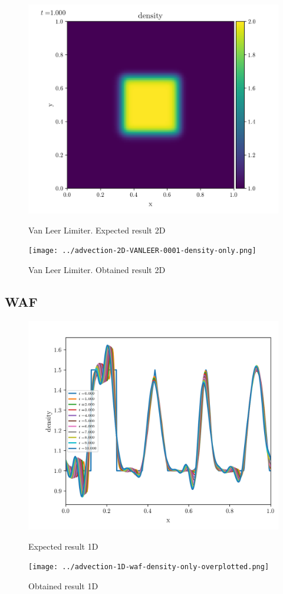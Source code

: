     \begin{figure}[htbp]
        \centering
        \includegraphics[width=.7\textwidth]{./figures/advection-2D-VANLEER-0001-density-only.png}%
        \caption{Van Leer Limiter. Expected result 2D}
        \texttt{[image: ../advection-2D-VANLEER-0001-density-only.png]}%
        \caption{Van Leer Limiter. Obtained result 2D}
    \end{figure}







\clearpage
\subsection{WAF}


    \begin{figure}[htbp]
        \centering
        \includegraphics[width=.7\textwidth]{./figures/advection-1D-waf-density-only-overplotted.png}%
        \caption{Expected result 1D}
        \texttt{[image: ../advection-1D-waf-density-only-overplotted.png]}%
        \caption{Obtained result 1D}
    \end{figure}

